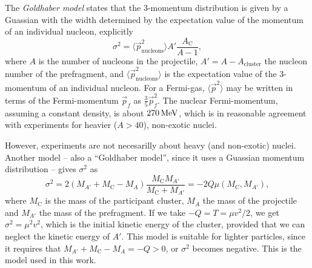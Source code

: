 The \emph{Goldhaber model} states that the 3-momentum distribution is given by a Guassian with the width determined by the expectation value of the momentum of an individual nucleon, explicitly
\begin{equation}
\sigma^2 = \langle \vec{p}_\text{nucleons}^2 \rangle A'\frac{A_\text{C}}{A-1},
\end{equation}
where $A$ is the number of nucleons in the projectile, $A' = A-A_\text{cluster}$ the nucleon number of the prefragment, and $\langle \vec{p}_\text{nucleons}^2 \rangle$ is the expectation value of the 3-momentum of an individual nucleon. For a Fermi-gas, $\langle \vec{p}^2 \rangle$ may be written in terms of the Fermi-momentum $\vec{p}_f$ as $\tfrac{3}{5} \vec{p}_f^2$\cite{goldhaber:1974:art}.
The nuclear Fermi-momentum, assuming a constant density, is about $\unit[270]{MeV}$, which is in reasonable agreement with experiments for heavier ($A>40$), non-exotic nuclei\cite{moniz:1971}. 

However, \rtb{} experiments are not necesarilly about heavy (and non-exotic) nuclei. Another model -- also a ``Goldhaber model'', since it uses a Guassian momentum distribution -- gives $\sigma^2$ as
\begin{equation}
\sigma^2 = 2 (M_{A'} + M_\text{C} -M_A) \frac{M_\text{C}M_{A'}}{M_\text{C}+M_{A'}} = -2 Q \mu(M_\text{C},M_{A'}),
\end{equation}
where $M_\text{C}$ is the mass of the participant cluster, $M_A$ the mass of the projectile and $M_{A'}$ the mass of the prefragment. If we take $-Q=T = \mu v^2/2$, we get $\sigma^2 = \mu^2 v^2$, which is the initial kinetic energy of the cluster, provided that we can neglect the kinetic energy of $A'$. This model is suitable for lighter particles, since it requires that $M_{A'} + M_\text{C} -M_A = -Q >0$, or $\sigma^2$ becomes negative. This is the model used in this work.

